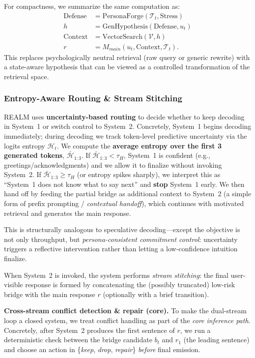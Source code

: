 \documentclass{article}
\begin{document}
For compactness, we summarize the same computation as:
\begin{align}
    \text{Defense} &= \text{PersonaForge}(\mathcal{T}_t, \text{Stress}) \label{eq:defense} \\
    h &= \text{GenHypothesis}(\text{Defense}, u_t) \\
    \text{Context} &= \text{VectorSearch}(\mathcal{V}, h) \\
    r &= M_{main}(u_t, \text{Context}, \mathcal{T}_t).
\end{align}
This replaces psychologically neutral retrieval (raw query or generic rewrite) with a state-aware hypothesis that can be viewed as a controlled transformation of the retrieval space.

\subsubsection{Entropy-Aware Routing \& Stream Stitching}
REALM uses \textbf{uncertainty-based routing} to decide whether to keep decoding in System~1 or switch control to System~2.
Concretely, System~1 begins decoding immediately; during decoding we track token-level predictive uncertainty via the logits entropy $\mathcal{H}_t$.
We compute the \textbf{average entropy over the first 3 generated tokens}, $\bar{\mathcal{H}}_{1:3}$.
If $\bar{\mathcal{H}}_{1:3} < \tau_H$, System~1 is confident (e.g., greetings/acknowledgments) and we allow it to finalize without invoking System~2.
If $\bar{\mathcal{H}}_{1:3} \ge \tau_H$ (or entropy spikes sharply), we interpret this as ``System~1 does not know what to say next'' and \textbf{stop} System~1 early.
We then hand off by feeding the partial bridge as additional context to System~2 (a simple form of prefix prompting / \emph{contextual handoff}), which continues with motivated retrieval and generates the main response.

This is structurally analogous to speculative decoding---except the objective is not only throughput, but \emph{persona-consistent commitment control}: uncertainty triggers a reflective intervention rather than letting a low-confidence intuition finalize.

When System~2 is invoked, the system performs \emph{stream stitching}: the final user-visible response is formed by concatenating the (possibly truncated) low-risk bridge with the main response $r$ (optionally with a brief transition).

\textbf{Cross-stream conflict detection \& repair (core).}
To make the dual-stream loop a closed system, we treat conflict handling as part of the \emph{core inference path}.
Concretely, after System~2 produces the first sentence of $r$, we run a deterministic check between the bridge candidate $b_t$ and $r_{1}$ (the leading sentence) and choose an action in \{\emph{keep}, \emph{drop}, \emph{repair}\} \emph{before} final emission.
\end{document}
